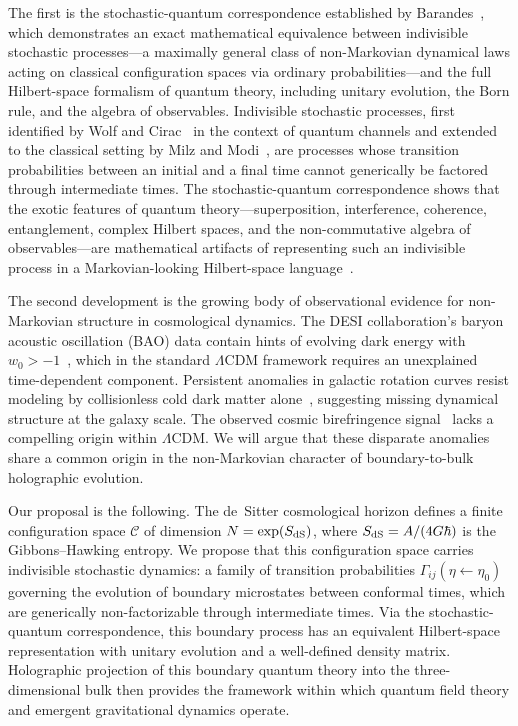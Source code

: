 \documentclass[aps,prd,twocolumn,superscriptaddress,nofootinbib]{revtex4-2}
\begin{document}
The first is the stochastic-quantum correspondence established by Barandes~\cite{Barandes2025SQC,Barandes2025SQT,Barandes2025QSIP}, which demonstrates an exact mathematical equivalence between indivisible stochastic processes---a maximally general class of non-Markovian dynamical laws acting on classical configuration spaces via ordinary probabilities---and the full Hilbert-space formalism of quantum theory, including unitary evolution, the Born rule, and the algebra of observables. Indivisible stochastic processes, first identified by Wolf and Cirac~\cite{WolfCirac2008} in the context of quantum channels and extended to the classical setting by Milz and Modi~\cite{MilzModi2021}, are processes whose transition probabilities between an initial and a final time cannot generically be factored through intermediate times. The stochastic-quantum correspondence shows that the exotic features of quantum theory---superposition, interference, coherence, entanglement, complex Hilbert spaces, and the non-commutative algebra of observables---are mathematical artifacts of representing such an indivisible process in a Markovian-looking Hilbert-space language~\cite{Barandes2025SQC}.

The second development is the growing body of observational evidence for non-Markovian structure in cosmological dynamics. The DESI collaboration's baryon acoustic oscillation (BAO) data contain hints of evolving dark energy with $w_0 > -1$~\cite{DESI2024}, which in the standard $\Lambda$CDM framework requires an unexplained time-dependent component. Persistent anomalies in galactic rotation curves resist modeling by collisionless cold dark matter alone~\cite{McGaugh2016SPARC,Lelli2017}, suggesting missing dynamical structure at the galaxy scale. The observed cosmic birefringence signal~\cite{MinamiKomatsu2020,Eskilt2022} lacks a compelling origin within $\Lambda$CDM. We will argue that these disparate anomalies share a common origin in the non-Markovian character of boundary-to-bulk holographic evolution.

Our proposal is the following. The de~Sitter cosmological horizon defines a finite configuration space $\mathcal{C}$ of dimension $N = \exp(S_{\rm dS})$, where $S_{\rm dS} = A/(4G\hbar)$ is the Gibbons--Hawking entropy. We propose that this configuration space carries indivisible stochastic dynamics: a family of transition probabilities $\Gamma_{ij}(\eta \leftarrow \eta_0)$ governing the evolution of boundary microstates between conformal times, which are generically non-factorizable through intermediate times. Via the stochastic-quantum correspondence, this boundary process has an equivalent Hilbert-space representation with unitary evolution and a well-defined density matrix. Holographic projection of this boundary quantum theory into the three-dimensional bulk then provides the framework within which quantum field theory and emergent gravitational dynamics operate.
\end{document}
